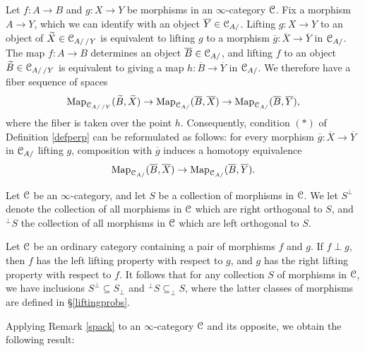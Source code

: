 \begin{remark}\label{spack}
Let $f: A \rightarrow B$ and $g: X \rightarrow Y$ be morphisms in an $\infty$-category $\operatorname{\mathcal{C}}$.
Fix a morphism $A \rightarrow Y$, which we can identify with an object
$\overline{Y} \in \operatorname{\mathcal{C}}_{A/}$. Lifting $g: X \rightarrow Y$ to an object of
$\widetilde{X} \in \operatorname{\mathcal{C}}_{A/ \, /Y}$ is equivalent to lifting $g$ to a morphism
$\overline{g}: \overline{X} \rightarrow \overline{Y}$ in $\operatorname{\mathcal{C}}_{A/}$.
The map $f: A \rightarrow B$ determines an object $\overline{B} \in \operatorname{\mathcal{C}}_{A/}$, 
and lifting $f$ to an object $\widetilde{B} \in \operatorname{\mathcal{C}}_{A/ \, /Y}$ is equivalent to giving a map 
$h: \overline{B} \rightarrow \overline{Y}$ in $\operatorname{\mathcal{C}}_{A/}$. We therefore have a fiber
sequence of spaces
$$ \operatorname{{Map}}_{ \operatorname{\mathcal{C}}_{ A/ \, /Y} }( \widetilde{B}, \widetilde{X} )
\rightarrow \operatorname{{Map}}_{\operatorname{\mathcal{C}}_{A/}}( \overline{B}, \overline{X} )
\rightarrow \operatorname{{Map}}_{\operatorname{\mathcal{C}}_{A/}}( \overline{B}, \overline{Y} ),$$
where the fiber is taken over the point $h$. Consequently, condition
$(\ast)$ of Definition \ref{defperp} can be reformulated as follows:
for every morphism $\overline{g}: \overline{X} \rightarrow \overline{Y}$ in
$\operatorname{\mathcal{C}}_{A/}$ lifting $g$, composition with $\overline{g}$ induces a homotopy equivalence
$$ \operatorname{{Map}}_{\operatorname{\mathcal{C}}_{A/}}( \overline{B}, \overline{X} ) \rightarrow \operatorname{{Map}}_{\operatorname{\mathcal{C}}_{A/}}( \overline{B}, \overline{Y}).$$
\end{remark}

\begin{notation}
Let $\operatorname{\mathcal{C}}$ be an $\infty$-category, and let $S$ be a collection of morphisms in $\operatorname{\mathcal{C}}$. We let
$S^{\perp}$ denote the collection of all morphisms in $\operatorname{\mathcal{C}}$ which are right orthogonal to $S$, and
$^{\perp}S$ the collection of all morphisms in $\operatorname{\mathcal{C}}$ which are left orthogonal to $S$.
\end{notation}

\begin{remark}
Let $\operatorname{\mathcal{C}}$ be an ordinary category containing a pair of morphisms $f$ and $g$. If $f \perp g$, then
$f$ has the left lifting property with respect to $g$, and $g$ has the right lifting property with respect to $f$. It follows that for any collection $S$ of morphisms in $\operatorname{\mathcal{C}}$, we have inclusions
$S^{\perp} \subseteq S_{\perp}$ and $^{\perp} S \subseteq _{\perp}S$, where the latter classes of morphisms are defined in \S \ref{liftingprobs}.
\end{remark}

Applying Remark \ref{spack} to an $\infty$-category $\operatorname{\mathcal{C}}$ and its opposite, we obtain the following result:

